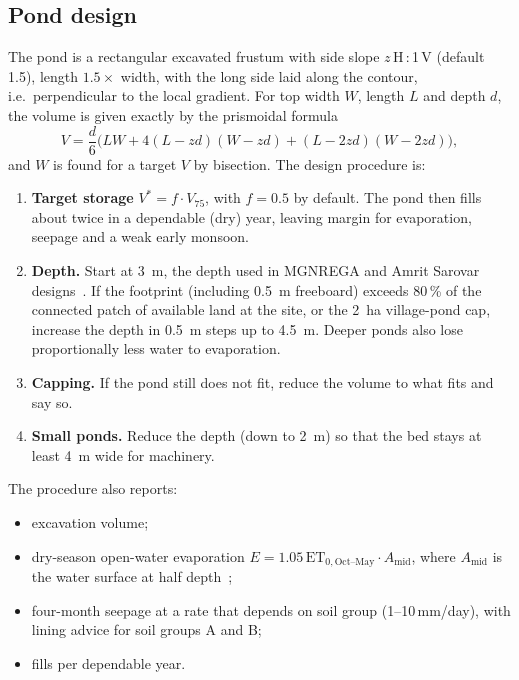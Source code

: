 \documentclass[11pt,a4paper]{article}
\begin{document}
\subsection{Pond design}\label{sec:pond}
The pond is a rectangular excavated frustum with side slope $z$\,H\,:\,1\,V (default 1.5),
length $1.5\times$ width, with the long side laid along the contour, i.e.\ perpendicular to
the local gradient. For top width $W$, length $L$ and depth $d$, the volume is given exactly
by the prismoidal formula
\begin{equation}
V=\frac{d}{6}\Big(LW + 4(L-zd)(W-zd) + (L-2zd)(W-2zd)\Big),
\end{equation}
and $W$ is found for a target $V$ by bisection. The design procedure is:
\begin{enumerate}
  \item \textbf{Target storage} $V^\ast = f\cdot V_{75}$, with $f=0.5$ by default. The pond
        then fills about twice in a dependable (dry) year, leaving margin for evaporation,
        seepage and a weak early monsoon.
  \item \textbf{Depth.} Start at \SI{3}{m}, the depth used in MGNREGA and Amrit Sarovar
        designs~\cite{amritsarovar}. If the footprint (including \SI{0.5}{m} freeboard)
        exceeds 80\,\% of the connected patch of available land at the site, or the
        \SI{2}{ha} village-pond cap, increase the depth in \SI{0.5}{m} steps up to
        \SI{4.5}{m}. Deeper ponds also lose proportionally less water to evaporation.
  \item \textbf{Capping.} If the pond still does not fit, reduce the volume to what fits and
        say so.
  \item \textbf{Small ponds.} Reduce the depth (down to \SI{2}{m}) so that the bed stays at
        least \SI{4}{m} wide for machinery.
\end{enumerate}
The procedure also reports:
\begin{itemize}
  \item excavation volume;
  \item dry-season open-water evaporation $E=1.05\,\mathrm{ET}_{0,\text{Oct--May}}\cdot A_{\text{mid}}$,
        where $A_{\text{mid}}$ is the water surface at half depth~\cite{allen1998};
  \item four-month seepage at a rate that depends on soil group (1--10\,mm/day),
        with lining advice for soil groups A and B;
  \item fills per dependable year.
\end{itemize}
\end{document}

